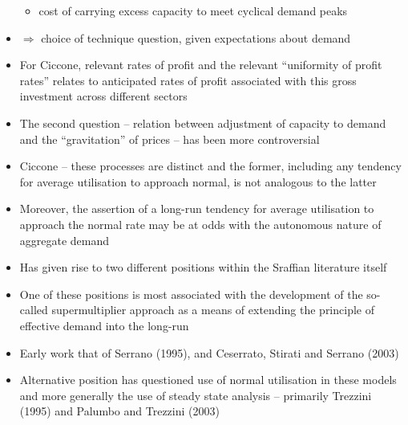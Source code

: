 \documentclass{article}
\begin{document}
\begin{itemize}
\begin{itemize}
			\item cost of carrying excess capacity to meet cyclical demand peaks
		\end{itemize}
		\item \( \Rightarrow \) choice of technique question, given expectations about demand
		\item For Ciccone, relevant rates of profit and the relevant ``uniformity of profit rates'' relates to anticipated rates of profit associated with this gross investment across different sectors 
		\item The second question -- relation between adjustment of capacity to demand and the ``gravitation'' of prices -- has been more controversial
		\item Ciccone -- these processes are distinct and the former, including any tendency for average utilisation to approach normal, is not analogous to the latter
		\item Moreover, the assertion of a long-run tendency for average utilisation to approach the normal rate may be at odds with the autonomous nature of aggregate demand
		\item Has given rise to two different positions within the Sraffian literature itself
		\item One of these positions is most associated with the development of the so-called supermultiplier approach as a means of extending the principle of effective demand into the long-run
		\item Early work that of Serrano (1995), and Ceserrato, Stirati and Serrano (2003)
		\item Alternative position has questioned use of normal utilisation in these models and more generally the use of steady state analysis -- primarily Trezzini (1995) and Palumbo and Trezzini (2003)
	\end{itemize}
\end{document}
